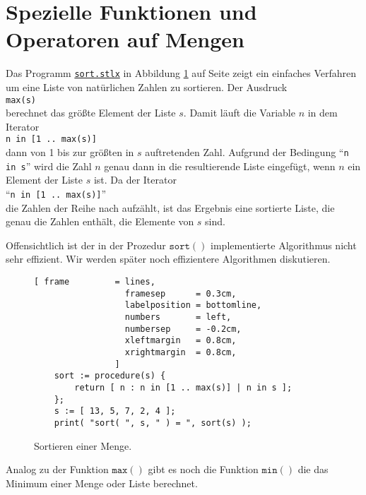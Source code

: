 \section{Spezielle Funktionen und Operatoren auf Mengen}
Das Programm 
\href{https://github.com/karlstroetmann/Logik/blob/master/SetlX/sort.stlx}{\texttt{sort.stlx}}
in Abbildung \ref{fig:sort.stlx} auf Seite
\pageref{fig:sort.stlx} zeigt ein einfaches Verfahren
 um eine Liste von natürlichen Zahlen zu sortieren.  
Der Ausdruck \\[0.2cm]
\hspace*{1.3cm}
\texttt{max(s)}
\\[0.2cm]
berechnet das größte Element der Liste $s$.  
Damit läuft die Variable $n$ in dem Iterator
\\[0.2cm]
\hspace*{1.3cm}
\texttt{n in [1 .. max(s)]}
\\[0.2cm]
dann von 1 bis zur größten in $s$ auftretenden Zahl.  
Aufgrund der Bedingung ``\texttt{n in s}''
wird die Zahl $n$ genau dann in die resultierende Liste eingefügt, wenn $n$ ein
Element der Liste $s$ ist.  Da der Iterator 
\\[0.2cm]
\hspace*{1.3cm}
``\texttt{n in [1 .. max(s)]}'' 
\\[0.2cm]
die Zahlen der Reihe nach aufzählt, ist das
Ergebnis eine sortierte Liste, die genau die Zahlen enthält, die Elemente von $s$
sind.

Offensichtlich ist der in der Prozedur $\texttt{sort}()$ implementierte Algorithmus nicht sehr effizient.
Wir werden später noch effizientere Algorithmen diskutieren.

\begin{figure}[!ht]
  \centering
\begin{Verbatim}[ frame         = lines, 
                  framesep      = 0.3cm, 
                  labelposition = bottomline,
                  numbers       = left,
                  numbersep     = -0.2cm,
                  xleftmargin   = 0.8cm,
                  xrightmargin  = 0.8cm,
                ]
    sort := procedure(s) {
        return [ n : n in [1 .. max(s)] | n in s ];
    };
    s := [ 13, 5, 7, 2, 4 ];
    print( "sort( ", s, " ) = ", sort(s) );
\end{Verbatim} 
\vspace*{-0.3cm}
\caption{Sortieren einer Menge.}  \label{fig:sort.stlx}
\end{figure} %

Analog zu der Funktion $\mathtt{max}()$ gibt es noch die Funktion $\texttt{min}()$ die das
Minimum einer Menge oder Liste berechnet.  

